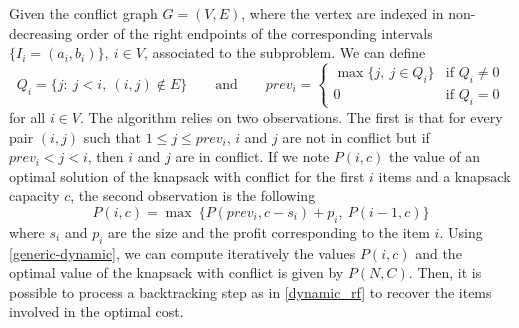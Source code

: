 Given the conflict graph $G=(V,E)$, where the vertex are indexed in non-decreasing order of the right endpoints of the corresponding intervals $\{I_i = (a_i , b_i)\}, \ i \in V$, associated to the subproblem. We can define 
\begin{equation*}
	Q_i = \{ j : \ j<i, \ (i,j) \notin E\} \qquad \text{and} \qquad prev_i = \begin{cases}
	\max \{j, \ j \in Q_i\} &\text{if }  Q_i \neq 0 \\
	0 &\text{if }  Q_i = 0
	\end{cases}
\end{equation*}
for all $i \in V$. The algorithm relies on two observations. The first is that for every pair $(i,j)$ such that $1 \leq j \leq prev_i$, $i$ and $j$ are not in conflict but if $prev_i < j < i$, then $i$ and $j$ are in conflict. If we note $P(i,c)$ the value of an optimal solution of the knapsack with conflict for the first $i$ items and a knapsack capacity $c$, the second observation is the following 
\begin{equation}
	\label{generic-dynamic}
	P(i,c) = \max \ \{P(prev_i,c-s_i) + p_i, \ P(i-1,c)\}
\end{equation}
where $s_i$ and $p_i$ are the size and the profit corresponding to the item $i$. Using \eqref{generic-dynamic}, we can compute iteratively the values $P(i,c)$ and the optimal value of the knapsack with conflict is given by $P(N,C)$. Then, it is possible to process a backtracking step as in \eqref{dynamic_rf} to recover the items involved in the optimal cost.